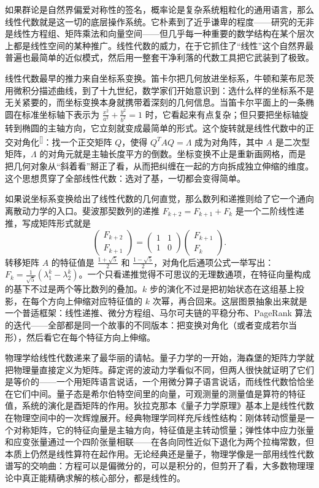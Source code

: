 \documentclass[UTF8]{ctexbook}
\begin{document}
如果群论是自然界偏爱对称性的签名，概率论是复杂系统粗粒化的通用语言，那么线性代数就是这一切的底层操作系统。它朴素到了近乎谦卑的程度——研究的无非是线性方程组、矩阵乘法和向量空间——但几乎每一种重要的数学结构在某个层次上都是线性空间的某种推广。线性代数的威力，在于它抓住了“线性”这个自然界最普遍也最简单的近似模式，然后用一整套干净利落的代数工具把它武装到了极致。

线性代数最早的推力来自坐标系变换。笛卡尔把几何放进坐标系，牛顿和莱布尼茨用微积分描述曲线，到了十九世纪，数学家们开始意识到：选什么样的坐标系不是无关紧要的，而坐标变换本身就携带着深刻的几何信息。当笛卡尔平面上的一条椭圆在标准坐标轴下表示为 $\frac{x^2}{a^2}+\frac{y^2}{b^2}=1$ 时，它看起来有点复杂；但只要把坐标轴旋转到椭圆的主轴方向，它立刻就变成最简单的形式。这个旋转就是线性代数中的正交对角化\textsuperscript{[\pageref{diag}]}：找一个正交矩阵 $Q$，使得 $Q^T A Q=\Lambda$ 成为对角阵，其中 $A$ 是二次型矩阵，$\Lambda$ 的对角元就是主轴长度平方的倒数。坐标变换不止是重新画网格，而是把几何对象从“斜着看”掰正了看，从而把纠缠在一起的方向拆成独立伸缩的维度。这个思想贯穿了全部线性代数：选对了基，一切都会变得简单。

如果说坐标系变换给出了线性代数的几何直觉，那么数列和递推则给了它一个通向离散动力学的入口。斐波那契数列的递推 $F_{k+2}=F_{k+1}+F_k$ 是一个二阶线性递推，写成矩阵形式就是
\[
\begin{pmatrix}F_{k+2}\\F_{k+1}\end{pmatrix}=
\begin{pmatrix}1&1\\1&0\end{pmatrix}
\begin{pmatrix}F_{k+1}\\F_k\end{pmatrix}.
\]
转移矩阵 $A$ 的特征值是 $\frac{1+\sqrt{5}}{2}$ 和 $\frac{1-\sqrt{5}}{2}$，对角化后通项公式一举写出：$F_k=\frac{1}{\sqrt{5}}(\lambda_1^k-\lambda_2^k)$。一个只看递推觉得不可思议的无理数通项，在特征向量构成的基下不过是两个等比数列的叠加。$k$ 步的演化不过是把初始状态在这组基上投影，在每个方向上伸缩对应特征值的 $k$ 次幂，再合回来。这层图景抽象出来就是一个普适框架：线性递推、微分方程组、马尔可夫链的平稳分布、PageRank 算法的迭代——全部都是同一个故事的不同版本：把变换对角化（或者变成若尔当形），然后看它在每个特征方向上伸缩。

物理学给线性代数递来了最华丽的请帖。量子力学的一开始，海森堡的矩阵力学就把物理量直接定义为矩阵。薛定谔的波动力学看似不同，但两人很快就证明了它们是等价的——一个用矩阵语言说话，一个用微分算子语言说话，而线性代数恰恰坐在它们中间。量子态是希尔伯特空间里的向量，可观测量的测量值是算符的特征值，系统的演化是酉矩阵的作用。狄拉克那本《量子力学原理》基本上是线性代数在物理空间中的一次辉煌展开。经典物理学同样充斥线性结构：刚体转动惯量是一个对称矩阵，它的特征向量是主轴方向，特征值是主转动惯量；弹性体中应力张量和应变张量通过一个四阶张量相联——在各向同性近似下退化为两个拉梅常数，但本质上仍然是线性算符在起作用。无论经典还是量子，物理学像是一部用线性代数谱写的交响曲：方程可以是偏微分的，可以是积分的，但剪开了看，大多数物理理论中真正能精确求解的核心部分，都是线性的。
\end{document}
